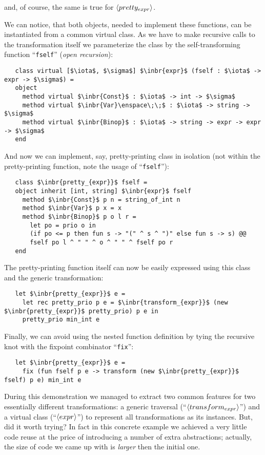 and, of course, the same is true for $\left<pretty_{expr}\right>$.

We can notice, that both objects, needed to implement these functions, can be instantiated from a common virtual class. As we have to make recursive calls to the transformation
itself we parameterize the class by the self-transforming function ``\lstinline{fself}'' (\emph{open recursion}):

\begin{lstlisting}
   class virtual [$\iota$, $\sigma$] $\inbr{expr}$ (fself : $\iota$ -> expr -> $\sigma$) =
   object
     method virtual $\inbr{Const}$ : $\iota$ -> int -> $\sigma$
     method virtual $\inbr{Var}\enspace\;\;$ : $\iota$ -> string -> $\sigma$
     method virtual $\inbr{Binop}$ : $\iota$ -> string -> expr -> expr -> $\sigma$  
   end
\end{lstlisting}

And now we can implement, say, pretty-printing class in isolation (not within the pretty-printing function, note the usage of ``\lstinline{fself}''):

\begin{lstlisting}
   class $\inbr{pretty_{expr}}$ fself =
   object inherit [int, string] $\inbr{expr}$ fself
     method $\inbr{Const}$ p n = string_of_int n
     method $\inbr{Var}$ p x = x
     method $\inbr{Binop}$ p o l r =
       let po = prio o in
       (if po <= p then fun s -> "(" ^ s ^ ")" else fun s -> s) @@
       fself po l ^ " " ^ o ^ " " ^ fself po r
   end
\end{lstlisting}

The pretty-printing function itself can now be easily expressed using this class and the generic transformation:

\begin{lstlisting}
   let $\inbr{pretty_{expr}}$ e =
     let rec pretty_prio p e = $\inbr{transform_{expr}}$ (new $\inbr{pretty_{expr}}$ pretty_prio) p e in
     pretty_prio min_int e
\end{lstlisting}

Finally, we can avoid using the nested function definition by tying the recursive knot with the fixpoint combinator ``\lstinline{fix}'':

\begin{lstlisting}
   let $\inbr{pretty_{expr}}$ e =
     fix (fun fself p e -> transform (new $\inbr{pretty_{expr}}$ fself) p e) min_int e
\end{lstlisting}

During this demonstration we managed to extract two common features for two essentially different transformations: a generic traversal (``$\left<transform_{expr}\right>$'')
and a virtual class (``$\left<expr\right>$'') to represent all transformations as its instances. But, did it worth trying? In fact in this concrete example we achieved a
very little code reuse at the price of introducing a number of extra abstractions; actually, the size of code we came up with is \emph{larger} then the initial one.

